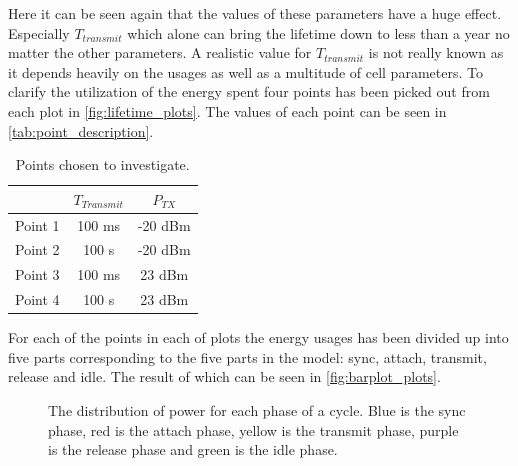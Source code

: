 Here it can be seen again that the values of these parameters have a huge effect. Especially $T_{transmit}$ which alone can bring the lifetime down to less than a year no matter the other parameters. A realistic value for $T_{transmit}$ is not really known as it depends heavily on the usages as well as a multitude of cell parameters. To clarify the utilization of the energy spent four points has been picked out from each plot in \autoref{fig:lifetime_plots}. The values of each point can be seen in \autoref{tab:point_description}.

\begin{table}[H]
\centering
\begin{tabular}{|c|c|c|} \hline
& $T_{Transmit}$ & $P_{TX}$ \\ \hline
Point 1 & 100 ms& -20 dBm  	\\ \hline
Point 2 & 100 s	& -20 dBm  	\\ \hline
Point 3 & 100 ms& 23 dBm 	\\ \hline
Point 4 & 100 s	& 23 dBm 	\\ \hline
\end{tabular}
\caption{Points chosen to investigate.}
\label{tab:point_description}
\end{table} 

For each of the points in each of plots the energy usages has been divided up into five parts corresponding to the five parts in the model: 	sync, attach, transmit, release and idle. The result of which can be seen in \autoref{fig:barplot_plots}.
 
 
\begin{figure}[H]
\centering
\begin{minipage}{0.48\textwidth}
\resizebox{\textwidth}{!}{
}
\end{minipage}
\hfill
\begin{minipage}{0.48\textwidth}
\resizebox{\textwidth}{!}{
}
\end{minipage}
\begin{minipage}{0.48\textwidth}
\resizebox{\textwidth}{!}{
}
\end{minipage}
\hfill
\begin{minipage}{0.48\textwidth}
\resizebox{\textwidth}{!}{
}
\end{minipage}
\caption{The distribution of power for each phase of a cycle. Blue is the sync phase, red is the attach phase, yellow is the transmit phase, purple is the release phase and green is the idle phase.}
\label{fig:barplot_plots}
\end{figure}

